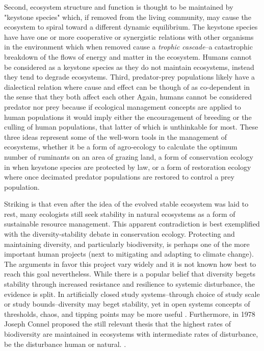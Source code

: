 Second, ecosystem structure and function is thought to be maintained by "keystone species" which, if removed from the living community, may cause the ecosystem to spiral toward a different dynamic equilibrium. The keystone species have have one or more cooperative or synergistic relations with other organisms in the environment which when removed cause a \textit{trophic cascade}--a catastrophic breakdown of the flows of energy and matter in the ecosystem. Humans cannot be considered as a keystone species as they do not maintain ecosystems, instead they tend to degrade ecosystems. Third, predator-prey populations likely have a dialectical relation where cause and effect can be though of as co-dependent in the sense that they both affect each other Again, humans cannot be considered predator nor prey because if ecological management concepts are applied to human populations it would imply either the encouragement of breeding or the culling of human populations, that latter of which is unthinkable for most. These three ideas represent some of the well-worn tools in the management of ecosystems, whether it be a form of agro-ecology to calculate the optimum number of ruminants on an area of grazing land, a form of conservation ecology in when keystone species are protected by law, or a form of restoration ecology where once decimated predator populations are restored to control a prey population. 

Striking is that even after the idea of the evolved stable ecosystem was laid to rest, many ecologists still seek stability in natural ecosystems as a form of sustainable resource management. This apparent contradiction is best exemplified with the diversity-stability debate in conservation ecology. Protecting and maintaining diversity, and particularly biodiversity, is perhaps one of the more important human projects (next to mitigating and adapting to climate change). The arguments in favor this project vary widely and it is not known how best to reach this goal nevertheless. While there is a popular belief that diversity begets stability through increased resistance and resilience to systemic disturbance, the evidence is split. In artificially closed study systems--through choice of study scale or study bounds--diversity may beget stability, yet in open systems concepts of thresholds, chaos, and tipping points may be more useful \citep[for opposing arguments see][]{tilman_1994,goodman_1975}. Furthermore, in 1978 Joseph Connel proposed the still relevant thesis that the highest rates of biodiversity are maintained in ecosystems with intermediate rates of disturbance, be the disturbance human or natural. \citep{connel_1978}. 


